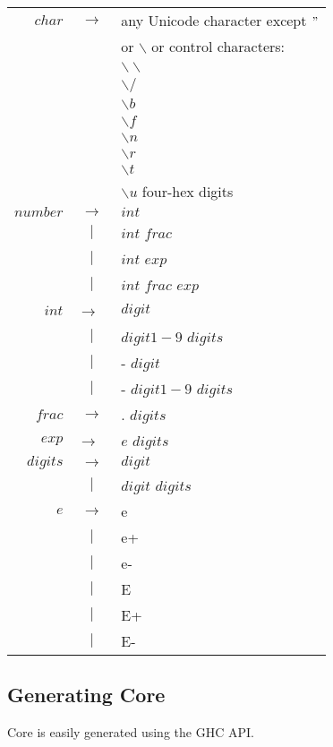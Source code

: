 \documentclass{article}
\begin{document}
\begin{tabular}{ r c l }
$char$		& $ \rightarrow $	& any Unicode character except $"$ \\ 
		&			& or $\backslash$ or control characters: \\
		&			& $\backslash\backslash$	\\
		&			& $\backslash /$ 		\\
		&			& $\backslash b$ 		\\
		& 			& $\backslash f$ 		\\
		&			& $\backslash n$		\\
		& 			& $\backslash r$ 		\\
		& 			& $\backslash t$ 		\\
		& 			& $\backslash u$ four-hex digits\\
$number$	& $ \rightarrow $ 	& $int$ 			\\
		& $ | $			& $int$ $frac$			\\
		& $ | $			& $int$ $exp$			\\
		& $ | $			& $int$ $frac$ $exp$		\\
$int$		& $ \rightarrow$ 	& $digit$			\\
		& $ | $ 		& $digit1-9$ $digits$		\\
		& $ | $ 		& - $digit$			\\
		& $ | $ 		& - $digit1-9$ $digits$	\\
$frac$ 		& $ \rightarrow $ 	& . $digits$ 		\\
$exp$		& $ \rightarrow $ 	& $e$ $digits$ 			\\
$digits$	& $ \rightarrow $ 	& $digit$			\\
		& $ | $ 		& $digit$ $digits$		\\
$e$		& $ \rightarrow $ 	& e				\\
		& $ | $ 		& e+				\\
		& $ | $ 		& e- 				\\
		& $ | $ 		& E				\\
		& $ | $ 		& E+				\\
		& $ | $ 		& E-				\\
\end{tabular}









\subsection{Generating Core}

Core is easily generated using the GHC API.
\end{document}
